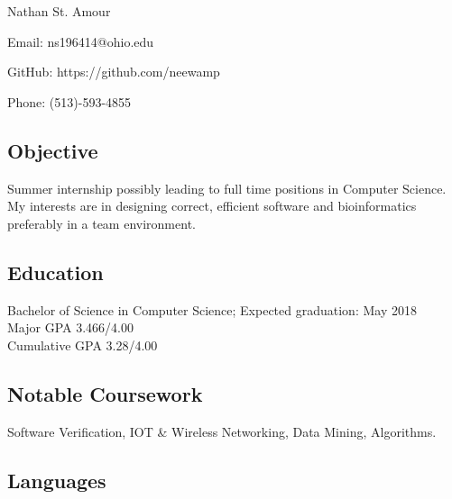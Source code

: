 \documentclass[11pt]{article} %
\newcommand{\name}[1]{
  \centerline{\Huge{#1}}
  }
\begin{document}
\thispagestyle{empty}
\name{Nathan St. Amour}
\begin{center}

 
 
\centerline{\large{Email: ns196414@ohio.edu}}
\centerline{GitHub: https://github.com/neewamp}
\centerline{\large{Phone: (513)-593-4855}}

\end{center}
\subsection*{Objective}
 Summer internship possibly leading to full time positions in Computer Science. My interests are in designing correct, efficient software and bioinformatics preferably in a team environment.
 \subsection*{Education}
 Bachelor of Science in Computer Science; Expected graduation: May 2018\\
 Major GPA   3.466/4.00 \\
 Cumulative GPA   3.28/4.00


 \subsection*{Notable Coursework}
Software Verification, IOT \& Wireless Networking, Data Mining,
Algorithms.
\subsection*{Languages}


\end{document}
